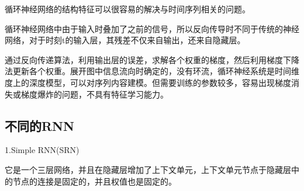 \documentclass[openbib]{article}
\begin{document}
循环神经网络的结构特征可以很容易的解决与时间序列相关的问题。

循环神经网络中由于输入时叠加了之前的信号，所以反向传导时不同于传统的神经网络，对于时刻t的输入层，其残差不仅来自输出，还来自隐藏层。

通过反向传递算法，利用输出层的误差，求解各个权重的梯度，然后利用梯度下降法更新各个权重。展开图中信息流向时确定的，没有环流，循环神经系统是时间维度上的深度模型，可以对序列内容建模。但需要训练的参数较多，容易出现梯度消失或梯度爆炸的问题，不具有特征学习能力。
\subsection{不同的RNN}
\begin{center}
	1.Simple RNN(SRN)
\end{center}
它是一个三层网络，并且在隐藏层增加了上下文单元，上下文单元节点于隐藏层中的节点的连接是固定的，并且权值也是固定的。
\end{document}
